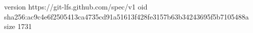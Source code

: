 version https://git-lfs.github.com/spec/v1
oid sha256:ac9c4e6f2505413ca4735cd91a51613f428fe3157b63b34243695f5b7105488a
size 1731
